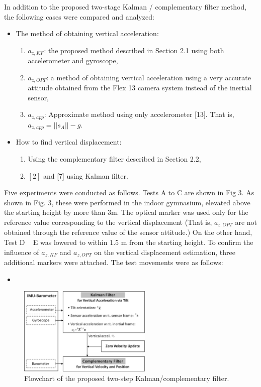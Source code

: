 \documentclass[10pt,journal,compsoc]{IEEEtran}
\begin{document}
In addition to the proposed two-stage Kalman / complementary filter method,
the following cases were compared and analyzed:

\begin{itemize}
\item The method of obtaining vertical acceleration: 
\begin{enumerate}
\item $a_{z,KF}$: the proposed method described in Section 2.1 using both accelerometer and gyroscope,
\item $a_{z,OPT}$: a method of obtaining vertical acceleration using a very accurate attitude obtained from the 
  Flex 13 camera system instead of the inertial sensor,
\item $a_{z,app}$: Approximate method using only accelerometer [13]. That is, $a_{z,app} = ||s_A|| - g$.
\end{enumerate}
\item How to find vertical displacement:
\begin{enumerate}
\item Using the complementary filter described in Section 2.2,
\item $[2]$ and [7] using Kalman filter.
\end{enumerate}
\end{itemize}

Five experiments were conducted as follows. Tests A to C are shown in Fig 3. As
shown in Fig. 3, these were performed in the indoor gymnasium, elevated above the
starting height by more than 3m. The optical marker was used only for the
reference value corresponding to the vertical displacement (That is, $a_{z,OPT}$
are not obtained through the reference value of the sensor attitude.) On the
other hand, Test D ~ E was lowered to within 1.5 m from the starting height.
To confirm the influence of $a_{z,KF}$ and $a_{z,OPT}$ on the vertical displacement
estimation, three additional markers were attached.  The test movements were as follows:
\begin{itemize}
    \item
\end{itemize}


\begin{figure}[!t]
\centering
\includegraphics[width=2.5in]{fig1}
    \caption{Flowchart of the proposed two-step Kalman/complementary filter.}
\label{fig1}
\end{figure}
\end{document}
